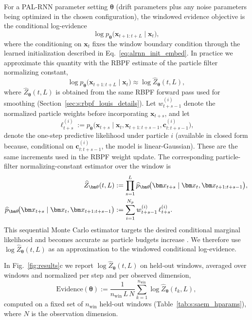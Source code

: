 \documentclass[twoside]{article}
\theoremstyle{plain}
\theoremstyle{definition}
\theoremstyle{remark}
\begin{document}
For a PAL-RNN parameter setting $\bm\theta$ (drift parameters plus any noise parameters being optimized in the chosen configuration), the windowed evidence objective is the conditional log-evidence
\begin{equation}
\log p_{\bm\theta}\!\big(\bm x_{t+1:t+L}\mid \bm x_t\big),
\end{equation}
where the conditioning on $\bm x_t$ fixes the window boundary condition through the learned initialization described in Eq.~\eqref{eq:alrnn_init_embed}. In practice we approximate this quantity with the RBPF estimate of the particle filter normalizing constant,
\begin{equation}
\log p_{\bm\theta}\!\big(\bm x_{t+1:t+L}\mid \bm x_t\big)
\approx \log \widehat Z_{\bm\theta}(t,L),
\end{equation}
where $\widehat Z_{\bm\theta}(t,L)$ is obtained from the same RBPF forward pass used for smoothing (Section~\ref{sec:s:rbpf_louis_details}). Let $w_{t+s-1}^{(i)}$ denote the normalized particle weights before incorporating $\bm x_{t+s}$, and let
\begin{equation}
\ell_{t+s}^{(i)}
:= p_{\bm\theta}\!\big(\bm x_{t+s}\mid \bm x_t,\bm x_{t+1:t+s-1},\bm c_{t:t+s-1}^{(i)}\big),
\end{equation}
denote the one-step predictive likelihood under particle $i$ (available in closed form because, conditional on $\bm c_{t:t+s-1}^{(i)}$, the model is linear-Gaussian). These are the same increments used in the RBPF weight update. The corresponding particle-filter normalizing-constant estimator over the window is
\begin{align}
\widehat Z_{\bm\theta}(t,L)
&:= \prod_{s=1}^{L} \widehat p_{\bm\theta}\!\big(\bm x_{t+s}\mid \bm x_t,\bm x_{t+1:t+s-1}\big),\notag\\
\widehat p_{\bm\theta}\!\big(\bm x_{t+s}\mid \bm x_t,\bm x_{t+1:t+s-1}\big)
&:= \sum_{i=1}^{N_p} w_{t+s-1}^{(i)}\,\ell_{t+s}^{(i)}.
\end{align}
This sequential Monte Carlo estimator targets the desired conditional marginal likelihood and becomes accurate as particle budgets increase \citep{doucet2000smc}. We therefore use $\log\widehat Z_{\bm\theta}(t,L)$ as an  approximation to the windowed conditional log-evidence.

In Fig.~\ref{fig:results}c we report $\log\widehat{Z}_{\bm\theta}(t,L)$ on held-out windows, averaged over windows and normalized per step and per observed dimension,
\begin{equation}
\label{eq:a2:evidence}
	\mathrm{Evidence}(\bm\theta)
	:= \frac{1}{n_{\mathrm{win}}\,L\,N}\sum_{k=1}^{n_{\mathrm{win}}} \log \widehat Z_{\bm\theta}(t_k,L),
\end{equation}
computed on a fixed set of $n_{\mathrm{win}}$ held-out windows (Table~\ref{tab:s:saem_hparams}), where $N$ is the observation dimension.
\end{document}
